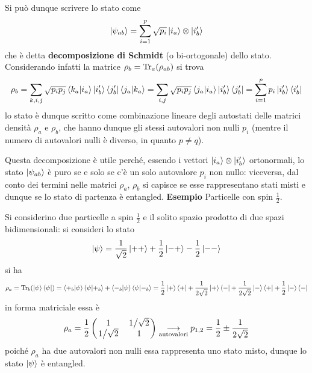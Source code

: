 Si può dunque scrivere lo stato come
$$\ket{\psi_{ab}}=\sum_{i=1}^{p}\sqrt{p_i}\ket{i_a}\otimes\ket{i'_b}$$
che è detta \textbf{decomposizione di Schmidt} (o bi-ortogonale) dello stato.
Considerando infatti la matrice $\rho_b=\Tr_a(\rho_{ab})$ si trova
$$\rho_b = \sum_{k,i,j}^{}\sqrt{p_ip_j}\bra{k_a}\ket{i_a}\ket{i'_b}\bra{j'_b}\bra{j_a}\ket{k_a}=
\sum_{i,j}^{}\sqrt{p_ip_j}\bra{j_a}\ket{i_a}\ket{i'_b}\bra{j'_b} =
\sum_{i=1}^{p}p_i\ket{i'_b}\bra{i'_b}$$
lo stato è dunque scritto come combinazione lineare degli autostati delle matrici densità
$\rho_a$ e $\rho_b$, che hanno dunque gli stessi autovalori non nulli $p_i$ (mentre il numero di
autovalori nulli è diverso, in quanto $p\not=q$).

Questa decomposizione è utile perché, essendo i vettori ${\ket{i_a}\otimes\ket{i'_b}}$ ortonormali,
lo stato $\ket{\psi_{ab}}$ è puro se e solo se c'è un solo autovalore $p_i$ non nullo: viceversa,
dal conto dei termini nelle matrici $\rho_a$, $\rho_b$ si capisce se esse rappresentano stati misti
e dunque se lo stato di partenza è entangled.
\newpage
\textbf{Esempio} Particelle con spin $\frac{1}{2}$.

Si considerino due particelle a spin $\frac12$ e il solito spazio prodotto di due spazi bidimensionali:
si consideri lo stato
$$\ket{\psi} = \frac{1}{\sqrt{2}}\ket{++}+\frac{1}{2}\ket{-+}-\frac{1}{2}\ket{--}$$
si ha
$$\rho_a = \Tr_b(\ket{\psi}\bra{\psi})=\bra{+_b}\ket{\psi}\bra{\psi}\ket{+_b}+
\bra{-_b}\ket{\psi}\bra{\psi}\ket{-_b}= \frac{1}{2}\ket{+}\bra{+}+\frac{1}{2\sqrt{2}}\ket{+}\bra{-}
+\frac{1}{2\sqrt{2}}\ket{-}\bra{+}+\frac{1}{2}\ket{-}\bra{-}
$$
in forma matriciale essa è
\begin{gather*}
\rho_a = \frac{1}{2}\begin{pmatrix}
    1&\flatfrac{1}{\sqrt{2}}\\
    \flatfrac{1}{\sqrt{2}}&1
\end{pmatrix} \underset{\text{autovalori}}\longrightarrow p_{1,2}=\frac{1}{2}\pm\frac{1}{2\sqrt{2}}
\end{gather*}
poiché $\rho_a$ ha due autovalori non nulli essa rappresenta uno stato misto, dunque lo stato
$\ket{\psi}$ è entangled.

